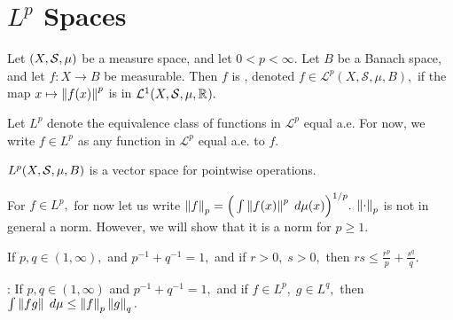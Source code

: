 \chapter{$L^p$ Spaces}
\begin{defn}
Let $(X,\mathcal{S},\mu)$ be a measure space, and let $0<p<\infty.$ Let $B$ be a Banach space, and let $f:X\rightarrow B$ be measurable. Then $f$ is , denoted $f\in \mathcal{L}^p(X,\mathcal{S},\mu, B),$ if the map $x\mapsto\left\lVert f(x)\right\rVert^p$ is in $\mathcal{L}^1(X,\mathcal{S},\mu,\mathbb{R}^{}).$ 
\end{defn}

Let $L^p$ denote the equivalence class of functions in $\mathcal{L}^p$ equal a.e. For now, we write $f\in L^p$ as any function in $\mathcal{L}^p$ equal a.e. to $f.$

\begin{prop}
$L^p(X,\mathcal{S},\mu,{B})$ is a vector space for pointwise operations. \\
\end{prop}

For $f\in L^p,$ for now let us write $\left\lVert f\right\rVert_p=\Big(\int\left\lVert f(x)\right\rVert^p\;d\mu(x)\Big)^{1/p}.$ $\left\lVert\cdot\right\rVert_p$ is not in general a norm. However, we will show that it is a norm for $p\geq 1.$

\begin{lemma}
If $p,q\in(1,\infty),$ and $p^{-1}+q^{-1}=1,$ and if $r>0,\; s>0,$ then $rs\leq\frac{r^p}{p}+\frac{s^q}{q}.$ \\
\end{lemma}

\begin{frame*}
\noindent{}: If $p,q\in(1,\infty)$ and $p^{-1}+q^{-1}=1,$ and if $f\in L^p,\; g\in L^q,$ then $\int\left\lVert fg\right\rVert\;d\mu\leq\left\lVert f\right\rVert_p\left\lVert g\right\rVert_q.$ \\
\end{frame*}

